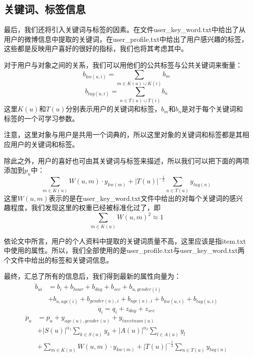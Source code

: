 \documentclass[12pt]{article} %
\newcommand\qq{\boldsymbol{\mathit{q}}}
\newcommand\pp{\boldsymbol{\mathit{p}}}
\newcommand\yy{\boldsymbol{\mathit{y}}}
\newcommand\zz{\boldsymbol{\mathit{z}}}
\begin{document}
\begin{sloppypar}
\subsection{关键词、标签信息}

最后，我们还将引入关键词与标签的因素。在文件user\_key\_word.txt中给出了从用户的微博信息中提取的关键词，在user\_profile.txt中给出了用户感兴趣的标签，这些都是反映用户喜好的很好的指标，我们也将其考虑其中。

对于用户与对象之间的关系，我们可以用他们的公共标签与公共关键词来衡量：
\begin{equation}
b_{kw(u,i)} = \sum_{m \in K(u) \cup K(i)} b_m
\end{equation}
\begin{equation}
b_{tag(u,i)} = \sum_{n \in T(u) \cup T(i)} b_n
\end{equation}
这里$K(u)$和$T(u)$分别表示用户的关键词和标签，$b_m$和$b_n$是对于每个关键词和标签的一个可学习参数。

注意，这里对象与用户是共用一个词典的，所以这里对象的关键词和标签都是其相应用户的关键词和标签。

除此之外，用户的喜好也可由其关键词与标签来描述，所以我们可以把下面的两项添加到$\pp_u$中：
\begin{equation}
\sum_{m \in K(u)} W(u,m) \cdot \yy_{kw(m)} + |T(u)|^{-\frac{1}{2}} \sum_{n \in T(u)} \yy_{tag(n)}
\end{equation}
这里$W(u,m)$表示的是在user\_key\_word.txt文件中给出的对每个关键词的感兴趣程度，我们发现这里的权重已经被标准化过了，即
\begin{equation}
\sum_{m \in K(u)} W(u,m)^2 \approx 1
\end{equation}

依论文中所言，用户的个人资料中提取的关键词质量不高，这里应该是指item.txt中使用的属性。所以，我们全部使用的是user\_profile.txt与user\_key\_word.txt两个文件中给出的标签和关键词信息。



最终，汇总了所有的信息后，我们得到最新的属性向量为：
\begin{align}
\ddot{b}_{ui} &= b_i + b_{hour} + b_{day} + b_{sec} + b_{u,gender(i)} \nonumber\\
&+ b_{u,age(i)} + b_{gender(u),i} + b_{age(u),i} + b_{kw(u,i)} + b_{tag(u,i)}
\end{align}
\begin{equation}
\ddot{\qq}_{i} = \qq_i + \zz_{day} + \zz_{sec}
\end{equation}
\begin{align}
\ddot{\pp}_{u} &= \pp_{u} + \yy_{age(u),gender(u)} + \yy_{tweetnum(u)} \nonumber\\
&+ |S(u)|^{\alpha_1}\sum_{k\in S(u)} \yy_k + |A(u)|^{\alpha_2} \sum_{l\in A(u)} \yy_l \nonumber\\
&+ \sum_{m \in K(u)} W(u,m) \cdot \yy_{kw(m)} + |T(u)|^{-\frac{1}{2}} \sum_{n \in T(u)} \yy_{tag(n)}
\end{align}


\end{sloppypar}
\end{document}
